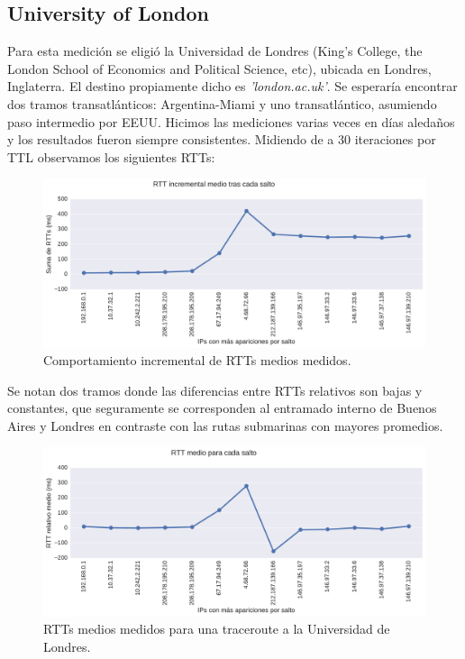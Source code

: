 \subsection{University of London}
\label{sec:london}

Para esta medición se eligió la Universidad de Londres (King's College, the London School of Economics and Political Science, etc), ubicada en Londres, Inglaterra. El destino propiamente dicho es \emph{'london.ac.uk'}. Se esperaría encontrar dos tramos transatlánticos: Argentina-Miami y uno transatlántico, asumiendo paso intermedio por EEUU. Hicimos las mediciones varias veces en días aledaños y los resultados fueron siempre consistentes.  Midiendo de a 30 iteraciones por TTL observamos los siguientes RTTs:
\\

\begin{figure}[H]
    \centering
    \includegraphics[width=1\textwidth, height=1\textheight, keepaspectratio]{../img/lan-incrementales}
    \caption{Comportamiento incremental de RTTs medios medidos.}
    \label{fig:lan-incrementales}
\end{figure}

Se notan dos tramos donde las diferencias entre RTTs relativos son bajas y constantes, que seguramente se corresponden al entramado interno de Buenos Aires y Londres en contraste con las rutas submarinas con mayores promedios.

\begin{figure}[H]
   \centering
       \includegraphics[width=1\textwidth, height=1\textheight, keepaspectratio]{../img/lan-rtts}
 \caption{RTTs medios medidos para una traceroute a la Universidad de Londres.}
 \label{fig:lan-rtts}
\end{figure}


